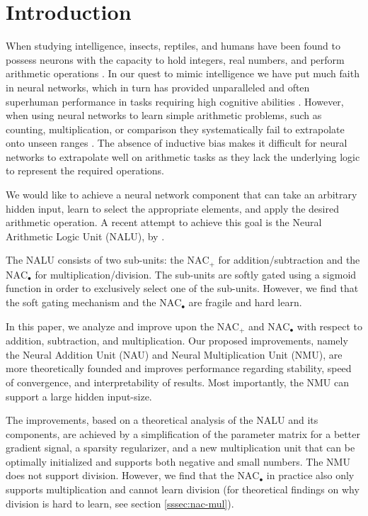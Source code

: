 \section{Introduction}
When studying intelligence, insects, reptiles, and humans have been found to possess neurons with the capacity to hold integers, real numbers, and perform arithmetic operations \cite{nieder-neuronal-number,rugani-arithmetic-chicks,gallistel-numbers-in-brain}.
In our quest to mimic intelligence we have put much faith in neural networks, which in turn has provided unparalleled and often superhuman performance in tasks requiring high cognitive abilities \cite{natureGo,bert,openai-learning-dexterous}.
However, when using neural networks to learn simple arithmetic problems, such as counting, multiplication, or comparison they systematically fail to extrapolate onto unseen ranges \cite{stillNotSystematic,suzgun2019evaluating,trask-nalu}.
The absence of inductive bias makes it difficult for neural networks to extrapolate well on arithmetic tasks as they lack the underlying logic to represent the required operations.

We would like to achieve a neural network component that can take an arbitrary hidden input, learn to select the appropriate elements, and apply the desired arithmetic operation.
A recent attempt to achieve this goal is the Neural Arithmetic Logic Unit (NALU), by \citet{trask-nalu}.

The NALU consists of two sub-units: the $\text{NAC}_{+}$ for addition/subtraction and the $\text{NAC}_{\bullet}$ for multiplication/division.
The sub-units are softly gated using a sigmoid function in order to exclusively select one of the sub-units.
However, we find that the soft gating mechanism and the $\text{NAC}_{\bullet}$ are fragile and hard learn.

In this paper, we analyze and improve upon the $\text{NAC}_{+}$ and $\text{NAC}_{\bullet}$ with respect to addition, subtraction, and multiplication.
Our proposed improvements, namely the Neural Addition Unit (NAU) and Neural Multiplication Unit (NMU), are more theoretically founded and improves performance regarding stability, speed of convergence, and interpretability of results.
Most importantly, the NMU can support a large hidden input-size.

The improvements, based on a theoretical analysis of the NALU and its components, are achieved by a simplification of the parameter matrix for a better gradient signal, a sparsity regularizer, and a new multiplication unit that can be optimally initialized and supports both negative and small numbers.
The NMU does not support division.
However, we find that the $\text{NAC}_{\bullet}$ in practice also only supports multiplication and cannot learn division (for theoretical findings on why division is hard to learn, see section \ref{sssec:nac-mul}).


